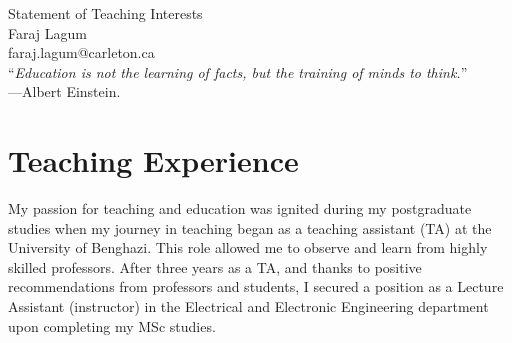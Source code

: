 \documentclass[11pt]{article}
\begin{document}
\begin{center}
{\Large Statement of Teaching Interests} \\[.3in]
{\large Faraj Lagum}\\
faraj.lagum@carleton.ca \\
\vspace*{.5in}
{``\emph{Education is not the learning of facts, but the training of minds to think.}'' \\ ---Albert Einstein.}
\end{center}








\section{Teaching Experience}



 My passion for teaching and education was ignited during my postgraduate studies when my journey in teaching began as a teaching assistant (TA) at the University of Benghazi. This role allowed me to observe and learn from highly skilled professors. %
After three years as a TA, and thanks to positive recommendations from professors and students, I secured a position as a Lecture Assistant (instructor) in the Electrical and Electronic Engineering department upon completing my MSc studies.
\end{document}
